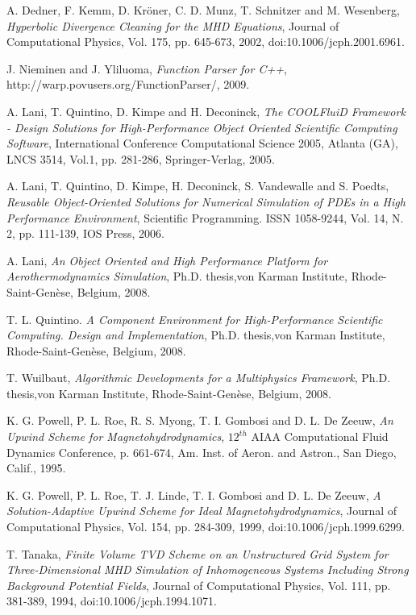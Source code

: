 \documentclass[11pt]{article}
\begin{document}
\begin{thebibliography}{00}

  A. Dedner, F. Kemm, D. Kr\"oner, C. D. Munz, T. Schnitzer and M. Wesenberg,
  {\it Hyperbolic Divergence Cleaning for the MHD Equations},
  Journal of Computational Physics, Vol. 175, pp. 645-673, 2002, doi:10.1006/jcph.2001.6961.
 
  J. Nieminen and J. Yliluoma,
  {\it Function Parser for C++},  
  http://warp.povusers.org/FunctionParser/, 2009.
 
  A. Lani, T. Quintino, D. Kimpe and H. Deconinck, 
  {\it The COOLFluiD Framework - Design Solutions for High-Performance Object Oriented Scientific Computing Software}, 
  International Conference Computational Science 2005, Atlanta (GA), LNCS 3514, Vol.1, pp. 281-286, Springer-Verlag, 2005. 

  A. Lani, T. Quintino, D. Kimpe, H. Deconinck, S. Vandewalle and S. Poedts, 
  {\it Reusable Object-Oriented Solutions for Numerical Simulation of PDEs in a High Performance Environment}, 
  Scientific Programming. ISSN 1058-9244, Vol. 14, N. 2, pp. 111-139, IOS Press, 2006.

  A. Lani, {\it An Object Oriented and High Performance Platform for Aerothermodynamics Simulation}, 
  Ph.D. thesis,von Karman Institute, Rhode-Saint-Gen\`ese, Belgium, 2008.
  
  T. L. Quintino. {\it A Component Environment for High-Performance Scientific Computing. Design and Implementation},
  Ph.D. thesis,von Karman Institute, Rhode-Saint-Gen\`ese, Belgium, 2008.
  
  T. Wuilbaut, {\it Algorithmic Developments for a Multiphysics Framework},  
  Ph.D. thesis,von Karman Institute, Rhode-Saint-Gen\`ese, Belgium, 2008.

  K. G. Powell, P. L. Roe, R. S. Myong, T. I. Gombosi and D. L. De Zeeuw,
  {\it An Upwind Scheme for Magnetohydrodynamics},
  $12^{th}$ AIAA Computational Fluid Dynamics Conference, p. 661-674, Am. Inst. of Aeron. and Astron., San Diego, Calif., 1995.

  K. G. Powell, P. L. Roe, T. J. Linde, T. I. Gombosi and D. L. De Zeeuw,
  {\it A Solution-Adaptive Upwind Scheme for Ideal Magnetohydrodynamics},
  Journal of Computational Physics, Vol. 154, pp. 284-309, 1999, doi:10.1006/jcph.1999.6299.

  T. Tanaka, {\it Finite Volume TVD Scheme on an Unstructured Grid System for Three-Dimensional MHD Simulation of Inhomogeneous Systems Including Strong Background Potential Fields},
  Journal of Computational Physics, Vol. 111, pp. 381-389, 1994, doi:10.1006/jcph.1994.1071.


\end{thebibliography}
\end{document}

